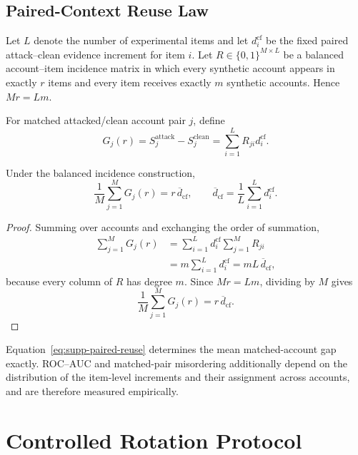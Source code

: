 
\subsection{Paired-Context Reuse Law}
\label{sec:supp-paired-theory}

Let $L$ denote the number of experimental items and let
$d_i^{\mathrm{cf}}$ be the fixed paired attack--clean evidence increment for
item $i$. Let $R\in\{0,1\}^{M\times L}$ be a balanced account--item incidence
matrix in which every synthetic account appears in exactly $r$ items and every
item receives exactly $m$ synthetic accounts. Hence $Mr=Lm$.

For matched attacked/clean account pair $j$, define
\[
G_j(r)
=
S_j^{\mathrm{attack}}
-
S_j^{\mathrm{clean}}
=
\sum_{i=1}^{L}R_{ji}d_i^{\mathrm{cf}}.
\]

\begin{corollary}
\label{cor:supp-paired-reuse}
Under the balanced incidence construction,
\begin{equation}
\label{eq:supp-paired-reuse}
\frac{1}{M}\sum_{j=1}^{M}G_j(r)
=
r\,\overline d_{\mathrm{cf}},
\qquad
\overline d_{\mathrm{cf}}
=
\frac{1}{L}\sum_{i=1}^{L}d_i^{\mathrm{cf}}.
\end{equation}
\end{corollary}

\begin{proof}
Summing over accounts and exchanging the order of summation,
\begin{align*}
\sum_{j=1}^{M}G_j(r)
&=
\sum_{i=1}^{L}
d_i^{\mathrm{cf}}
\sum_{j=1}^{M}R_{ji} \\
&=
m\sum_{i=1}^{L}d_i^{\mathrm{cf}}
=
mL\,\overline d_{\mathrm{cf}},
\end{align*}
because every column of $R$ has degree $m$. Since $Mr=Lm$, dividing by $M$
gives
\[
\frac{1}{M}\sum_{j=1}^{M}G_j(r)
=
r\,\overline d_{\mathrm{cf}}.
\]
\end{proof}

Equation~\eqref{eq:supp-paired-reuse} determines the mean matched-account
gap exactly. ROC--AUC and matched-pair misordering additionally depend on the
distribution of the item-level increments and their assignment across
accounts, and are therefore measured empirically.


\section{Controlled Rotation Protocol}
\label{sec:supp-rotation}

